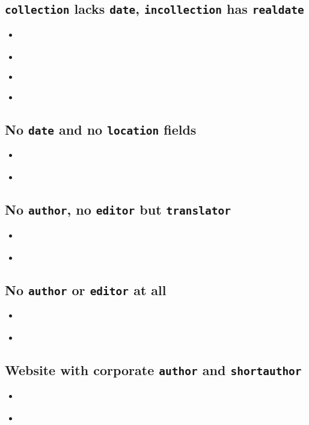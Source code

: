 \documentclass[a4paper,12pt,twoside]{scrartcl}
\newcommand*{\Typ}[1]{\texttt{\symbol{64}#1}}
\newcommand*{\Feld}[1]{\texttt{#1}}
\begin{document}
\subsection{\Typ{collection} lacks \Feld{date}, \Typ{incollection} has \Feld{realdate}}
\begin{itemize}
    \item\cite{huet:o:j}%
    \item{}%
    \item\cite{mette:1990}%
    \item{}%
\end{itemize}

\subsection{No \Feld{date} and no \Feld{location} fields}
\begin{itemize}
    \item\cite{fuchs:o:j}%
    \item{}%
\end{itemize}

\subsection{No \Feld{author}, no \Feld{editor} but \Feld{translator}}
\begin{itemize}
    \item\cite{sterk:1777}%
    \item{}%
\end{itemize}

\subsection{No \Feld{author} or \Feld{editor} at all}
\begin{itemize}
    \item\cite{domino:1780}%
    \item{}%
\end{itemize}

\subsection{Website with corporate \Feld{author} and \Feld{shortauthor}}
\begin{itemize}
    \item\cite{kenmore}%
    \item{}%
\end{itemize}
\end{document}
